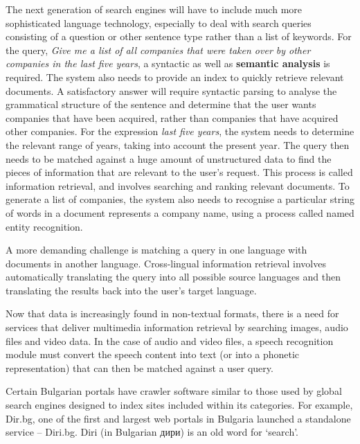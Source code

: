 \documentclass[]{../../metanetpaper}
\begin{document}
\begin{multicols}{2}

The next generation of search engines will have to include much more sophisticated language technology, especially to deal with search queries consisting of a question or other sentence type rather than a list of keywords. For the query, \textit{Give me a list of all companies that were taken over by other companies in the last five years}, a syntactic as well as \textbf{semantic analysis} is required. The system also needs to provide an index to quickly retrieve relevant documents. A satisfactory answer will require syntactic parsing to analyse the grammatical structure of the sentence and determine that the user wants companies that have been acquired, rather than companies that have acquired other companies. For the expression \textit{last five years}, the system needs to determine the relevant range of years, taking into account the present year. The query then needs to be matched against a huge amount of unstructured data to find the pieces of information that are relevant to the user’s request. This process is called information retrieval, and involves searching and ranking relevant documents. To generate a list of companies, the system also needs to recognise a particular string of words in a document represents a company name, using a process called named entity recognition.

A more demanding challenge is matching a query in one language with documents in another language. Cross-lingual information retrieval involves automatically translating the query into all possible source languages and then translating the results back into the user's target language.

Now that data is increasingly found in non-textual formats, there is a need for services that deliver multimedia information retrieval by searching images, audio files and video data. In the case of audio and video files, a speech recognition module must convert the speech content into text (or into a phonetic representation) that can then be matched against a user query.

Certain Bulgarian portals have crawler software similar to those used by global search engines designed to index sites included within its categories. For example, Dir.bg, one of the first and largest web portals in Bulgaria launched a standalone service – Diri.bg. Diri (in Bulgarian {дири}) is an old word for ‘search’. 


\end{multicols}
\end{document}
